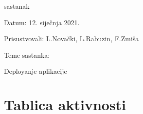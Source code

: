 \begin{packed_enum}
	\item  sastanak
	
	\item[] \begin{packed_item}
		\item Datum: 12. siječnja 2021.
		\item Prisustvovali: L.Novački, L.Rabuzin, F.Zmiša
		\item Teme sastanka:
		\begin{packed_item}
			\item  Deployanje aplikacije
		\end{packed_item}
	\end{packed_item}			
			
		\end{packed_enum}
		
		\eject
		\section*{Tablica aktivnosti}
		

